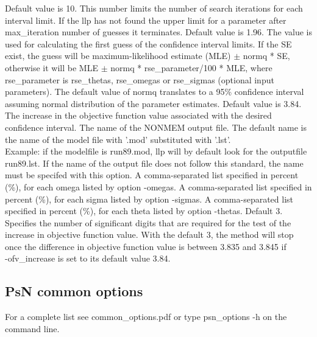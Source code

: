 \begin{optionlist}

Default value is 10. This number limits the number of search iterations for each interval limit. If the llp has not found the upper limit for a parameter after max\_iteration number of guesses it terminates. 
\nextopt
{}
Default value is 1.96. The value is used for calculating the first guess of the confidence interval limits. If the SE exist, the guess will be maximum-likelihood estimate (MLE) $\pm$ normq * SE, otherwise it will be MLE $\pm$ normq * rse\_parameter/100 * MLE, where rse\_parameter is rse\_thetas, rse\_omegas or rse\_sigmas (optional input parameters). The default value of normq translates to a 95\% confidence interval assuming normal distribution of the parameter estimates. 
\nextopt
{}
Default value is 3.84. The increase in the objective function value associated with the desired confidence interval. 
\nextopt
{}
The name of the NONMEM output file. The default name is the name of the model file with '.mod' substituted with '.lst'.\\
Example: if the modelfile is run89.mod, llp will by default look for the outputfile run89.lst. If the name of the output file does not follow this standard, the name must be specifed with this option. 
\nextopt
{}
A comma-separated list specified in percent (\%), for each omega listed by option -omegas. 
\nextopt
{}
A comma-separated list specified in percent (\%), for each sigma listed by option -sigmas. 
\nextopt
{}
A comma-separated list specified in percent (\%), for each theta listed by option -thetas. 
\nextopt
{}
Default 3. Specifies the number of significant digits that are required for the test of the increase in objective function value. With the default 3, the method will stop once the difference in objective function value is between 3.835 and 3.845 if\\ -ofv\_increase is set to its default value 3.84. 
\nextopt
\end{optionlist}

\subsection{PsN common options}
For a complete list see common\_options.pdf or type psn\_options -h on the command line.

